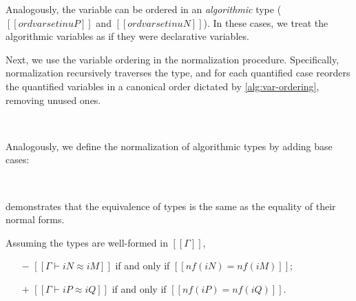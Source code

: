 \documentclass[acmsmall,natbib=false,review,anonymous]{acmart}
\begin{document}
\begin{algorithm}
  \label{alg:var-ordering}
  \hfill
  
  \ottdefnONVarLabeled{}
  \ottdefnOPVarLabeled{}

  Analogously, the variable can be ordered in 
  an \emph{algorithmic} type ($[[ord varset in uP]]$ and 
  $[[ord varset in uN]]$). In these cases, we treat the algorithmic variables
  as if they were declarative variables.

\end{algorithm}

Next, we use the variable ordering in the normalization procedure. 
Specifically, normalization recursively traverses the type, 
and for each quantified case reorders the quantified variables in a 
canonical order dictated by \cref{alg:var-ordering}, removing unused ones.

\begin{algorithm}
  \label{alg:type-nf}
  \hfill
  
  \begin{multicols}{2}
  \ottdefnNrmNNormLabeled{}
  \columnbreak\\
  \ottdefnNrmPNormLabeled{}
  \end{multicols}

  Analogously, we define the normalization of algorithmic types by adding base cases:

  \begin{multicols}{2}
  \ottdefnNrmuNNormLabeled{}
  \columnbreak\\
  \ottdefnNrmuPNormLabeled{}
  \end{multicols}

\end{algorithm}

demonstrates that the equivalence of types is the same
as the equality of their normal forms.
\begin{theorempreview}
  Assuming the types are well-formed in $[[Γ]]$, 
  \begin{itemize}
    \item [$-$] $[[Γ ⊢ iN ≈ iM]]$ if and only if $[[nf(iN) = nf(iM)]]$;
    \item [$+$] $[[Γ ⊢ iP ≈ iQ]]$ if and only if $[[nf(iP) = nf(iQ)]]$.
  \end{itemize}
\end{theorempreview}
\end{document}
